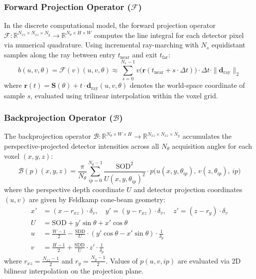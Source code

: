 \documentclass[11pt,a4paper]{article}
\begin{document}
\subsubsection{Forward Projection Operator ($\mathcal{F}$)}
In the discrete computational model, the forward projection operator $\mathcal{F}: \mathbb{R}^{N_{xz} \times N_{xz} \times N_y} \to \mathbb{R}^{N_\theta \times H \times W}$ computes the line integral for each detector pixel via numerical quadrature. Using incremental ray-marching with $N_s$ equidistant samples along the ray between entry $t_{\text{near}}$ and exit $t_{\text{far}}$:
\begin{equation}
    b(u, v, \theta) = \mathcal{F}(v)(u, v, \theta) \approx \sum_{s=0}^{N_s-1} v\big(\mathbf{r}(t_{\text{near}} + s \cdot \Delta t)\big) \cdot \Delta t \cdot \|\mathbf{d}_{\text{ray}}\|_2
    \label{eq:fp_discrete}
\end{equation}
where $\mathbf{r}(t) = \mathbf{S}(\theta) + t \cdot \mathbf{d}_{\text{ray}}(u, v, \theta)$ denotes the world-space coordinate of sample $s$, evaluated using trilinear interpolation within the voxel grid.

\subsubsection{Backprojection Operator ($\mathcal{B}$)}
The backprojection operator $\mathcal{B}: \mathbb{R}^{N_\theta \times W \times H} \to \mathbb{R}^{N_{xz} \times N_{xz} \times N_y}$ accumulates the perspective-projected detector intensities across all $N_\theta$ acquisition angles for each voxel $(x, y, z)$:
\begin{equation}
    \mathcal{B}(p)(x, y, z) = \frac{\pi}{N_\theta} \sum_{ip=0}^{N_\theta-1} \frac{\text{SOD}^2}{U(x, y, \theta_{ip})^2} \cdot p\big(u(x, y, \theta_{ip}),\, v(z, \theta_{ip}),\, ip\big)
    \label{eq:bp_discrete}
\end{equation}
where the perspective depth coordinate $U$ and detector projection coordinates $(u, v)$ are given by Feldkamp cone-beam geometry:
\begin{align}
    x' &= (x - r_{xz}) \cdot \delta_v, \quad y' = (y - r_{xz}) \cdot \delta_v, \quad z' = (z - r_y) \cdot \delta_v \\
    U &= \text{SOD} + y'\sin\theta + x'\cos\theta \label{eq:U_depth} \\
    u &= \frac{W-1}{2} - \frac{\text{SDD}}{U} \cdot (y'\cos\theta - x'\sin\theta) \cdot \frac{1}{\delta_p} \label{eq:u_coord} \\
    v &= \frac{H-1}{2} + \frac{\text{SDD}}{U} \cdot z' \cdot \frac{1}{\delta_p} \label{eq:v_coord}
\end{align}
where $r_{xz} = \frac{N_{xz}-1}{2}$ and $r_y = \frac{N_y-1}{2}$. Values of $p(u,v,ip)$ are evaluated via 2D bilinear interpolation on the projection plane.
\end{document}
